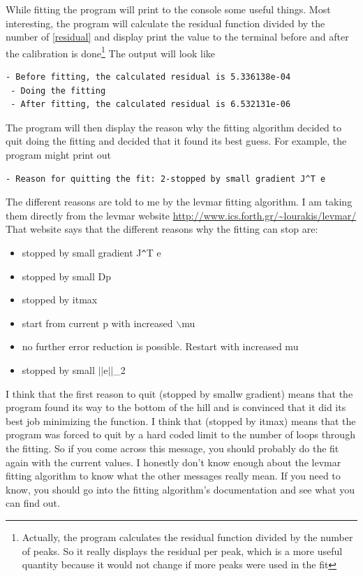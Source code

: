 While fitting the program will print to the
console some useful things. Most interesting,
the program will calculate the residual function
divided by the number of \ref{residual} and display
print the value to the terminal before and after
the calibration is done\footnote{Actually, the program
calculates the residual function divided by the number
of peaks. So it really displays the residual per peak, 
which is a more useful quantity because it would not
change if more peaks were used in the fit}
The output will look like
\begin{lstlisting}[caption={Displaying the Residual}]
 - Before fitting, the calculated residual is 5.336138e-04
 - Doing the fitting
 - After fitting, the calculated residual is 6.532131e-06
\end{lstlisting}
The program will then display the reason why the fitting
algorithm decided to quit doing the fitting and decided
that it found its best guess. For example, the program
might print out
\begin{lstlisting}[caption={Reason For Quitting}]
 - Reason for quitting the fit: 2-stopped by small gradient J^T e
\end{lstlisting}
The different reasons are told to me by the levmar fitting algorithm.
I am taking them directly from the levmar website
\url{http://www.ics.forth.gr/~lourakis/levmar/}
That website says that the different reasons why the
fitting can stop are:
\begin{itemize}
    \item stopped by small gradient J\verb!^!T e
    \item stopped by small Dp
    \item stopped by itmax
    \item start from current p with increased $\backslash$mu
    \item no further error reduction is possible. Restart with increased mu
    \item stopped by small $||$e$||$\_2\cite{lourakis04LM}
\end{itemize}
I think that the first reason to quit (stopped by smallw
gradient) means that the program found its way
to the bottom of the hill and is convinced that it did its best
job minimizing the function. I think that (stopped by itmax)
means that the program was forced to quit by a hard coded limit
to the number of loops through the fitting. So if you come across this
message, you should probably do the fit again with the current values.
I honestly don't know enough about the levmar fitting algorithm to
know what the other messages really mean. If you need to know, you 
should go into the fitting algorithm's documentation and see what you 
can find out.

